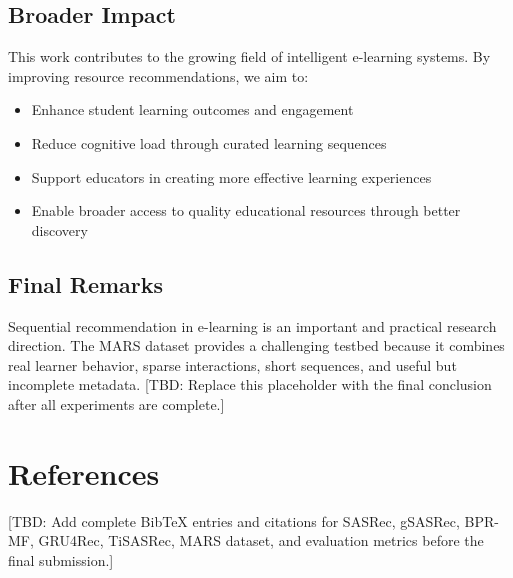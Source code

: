 \subsection{Broader Impact}

This work contributes to the growing field of intelligent e-learning systems. By improving resource recommendations, we aim to:

\begin{itemize}
    \item Enhance student learning outcomes and engagement
    \item Reduce cognitive load through curated learning sequences
    \item Support educators in creating more effective learning experiences
    \item Enable broader access to quality educational resources through better discovery
\end{itemize}

\subsection{Final Remarks}

Sequential recommendation in e-learning is an important and practical research direction. The MARS dataset provides a challenging testbed because it combines real learner behavior, sparse interactions, short sequences, and useful but incomplete metadata. [TBD: Replace this placeholder with the final conclusion after all experiments are complete.]

\vspace{1cm}

\section*{References}

[TBD: Add complete BibTeX entries and citations for SASRec, gSASRec, BPR-MF, GRU4Rec, TiSASRec, MARS dataset, and evaluation metrics before the final submission.]

\newpage
